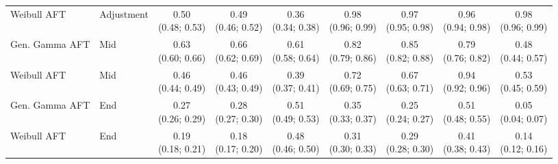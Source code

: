 \begin{table*}[htbp]
\begin{sideways}
\begin{tabular}{llccccccc}
\addlinespace
Weibull AFT & Adjustment & \makecell{0.50\\(0.48; 0.53)} & \makecell{0.49\\(0.46; 0.52)} & \makecell{0.36\\(0.34; 0.38)} & \makecell{0.98\\(0.96; 0.99)} & \makecell{0.97\\(0.95; 0.98)} & \makecell{0.96\\(0.94; 0.98)} & \makecell{0.98\\(0.96; 0.99)} \\
\addlinespace
Gen. Gamma AFT & Mid & \makecell{0.63\\(0.60; 0.66)} & \makecell{0.66\\(0.62; 0.69)} & \makecell{0.61\\(0.58; 0.64)} & \makecell{0.82\\(0.79; 0.86)} & \makecell{0.85\\(0.82; 0.88)} & \makecell{0.79\\(0.76; 0.82)} & \makecell{0.48\\(0.44; 0.57)} \\
\addlinespace
Weibull AFT & Mid & \makecell{0.46\\(0.44; 0.49)} & \makecell{0.46\\(0.43; 0.49)} & \makecell{0.39\\(0.37; 0.41)} & \makecell{0.72\\(0.69; 0.75)} & \makecell{0.67\\(0.63; 0.71)} & \makecell{0.94\\(0.92; 0.96)} & \makecell{0.53\\(0.45; 0.59)} \\
\addlinespace
Gen. Gamma AFT & End & \makecell{0.27\\(0.26; 0.29)} & \makecell{0.28\\(0.27; 0.30)} & \makecell{0.51\\(0.49; 0.53)} & \makecell{0.35\\(0.33; 0.37)} & \makecell{0.25\\(0.24; 0.27)} & \makecell{0.51\\(0.48; 0.55)} & \makecell{0.05\\(0.04; 0.07)} \\
\addlinespace
Weibull AFT & End & \makecell{0.19\\(0.18; 0.21)} & \makecell{0.18\\(0.17; 0.20)} & \makecell{0.48\\(0.46; 0.50)} & \makecell{0.31\\(0.30; 0.33)} & \makecell{0.29\\(0.28; 0.30)} & \makecell{0.41\\(0.38; 0.43)} & \makecell{0.14\\(0.12; 0.16)} \\
\bottomrule
\end{tabular}
\normalsize
\end{sideways}
\end{table*}
